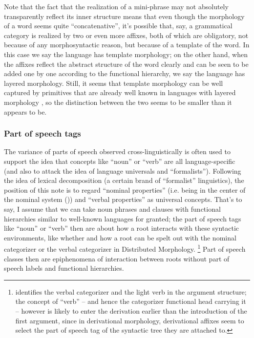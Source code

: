 \documentclass[UTF8, a4paper, oneside, scheme=plain, 12pt]{ctexbook}
\newcommand*{\citechap}[1]{Ch.~{#1}}
\begin{document}
{Note that the fact that the realization of a mini-phrase 
may not absolutely transparently reflect its inner structure 
means that even though the morphology of a word 
seems quite ``concatenative'',
it's possible that, say, 
a grammatical category is realized by two or even more affixes, 
both of which are obligatory,
not because of any morphosyntactic reason, 
but because of a template of the word. 
In this case we say the language has template morphology;
on the other hand, 
when the affixes reflect the abstract structure of the word clearly 
and can be seen to be added one by one 
according to the functional hierarchy,
we say the language has layered morphology.
Still, it seems that template morphology
can be well captured by primitives that are already well known 
in languages with layered morphology \cite{oxford2019fission},
so the distinction between the two seems to be smaller than it appears to be.

\subsubsection{Part of speech tags}\label{sec:theory.pos}

The variance of parts of speech observed cross-linguistically
is often used to support the idea that 
concepts like ``noun'' or ``verb'' 
are all language-specific
(and also to attack the idea of language universals and ``formalists'').
Following the idea of lexical decomposition (a certain brand of ``formalist'' linguistics),
the position of this note is to regard ``nominal properties''
(i.e. being in the center of the nominal system ())
and ``verbal properties''
as universal concepts.
That's to say, I assume that we can take noun phrases and clauses
with functional hierarchies similar to well-known languages 
for granted;
the part of speech tags like ``noun'' or ``verb''
then are about how a root interacts with these syntactic environments,
like whether and how a root can be spelt out 
with the nominal categorizer or the verbal categorizer in Distributed Morphology.%
\footnote{
    \citet[\citechap{10}]{siddiqi2009syntax} identifies 
    the verbal categorizer and the light verb in the argument structure; 
    the concept of ``verb'' -- and hence the categorizer functional head carrying it --  
    however is likely to enter the derivation 
    earlier than the introduction of the first argument, 
    since in derivational morphology, 
    derivational affixes seem to select the part of speech tag 
    of the syntactic tree they are attached to.
}
Part of speech classes then are epiphenomena 
of interaction between roots without part of speech labels  
and functional hierarchies.

}
\end{document}
